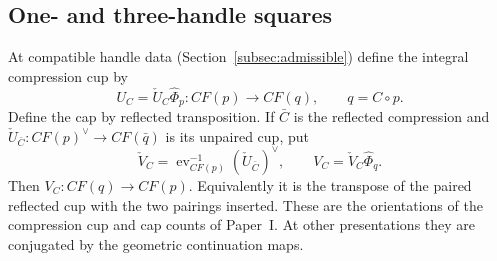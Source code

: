 \documentclass[11pt]{amsart}
\theoremstyle{definition}
\theoremstyle{remark}
\theoremstyle{plain}
\numberwithin{equation}{section}
\newcommand{\CF}{\mathit{CF}}
\newcommand{\ev}{\operatorname{ev}}
\begin{document}
\subsection{One- and three-handle squares}
At compatible handle data
(Section~\ref{subsec:admissible}) define
the integral compression cup by
\begin{equation}\label{eq:U}
 U_C=\check U_C\widehat\Phi_p:
               \CF(p)\longrightarrow\CF(q),
 \qquad q=C\circ p.
\end{equation}
Define the cap by reflected
transposition. If $\bar C$ is the
reflected compression and
$\check U_{\bar C}:\CF(p)^\vee\to\CF(\bar q)$
is its unpaired cup, put
\begin{equation}\label{eq:V}
 \check V_C=\ev_{\CF(p)}^{-1}
                  (\check U_{\bar C})^\vee,
 \qquad V_C=\check V_C\widehat\Phi_q.
\end{equation}
Then $V_C:\CF(q)\to\CF(p)$. Equivalently
it is the transpose of the paired
reflected cup with the two pairings
inserted. These are the orientations
of the compression cup and cap counts
of Paper~I. At other presentations
they are conjugated by the geometric
continuation maps.
\end{document}
